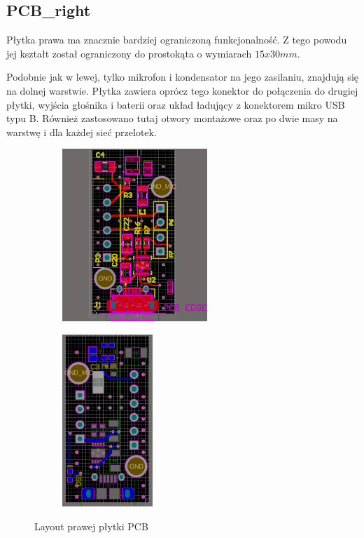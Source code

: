 \subsection{PCB\_right}

Płytka prawa ma znacznie bardziej ograniczoną funkcjonalność. Z tego powodu jej kształt został ograniczony do prostokąta o wymiarach $15x30mm$. 

Podobnie jak w lewej, tylko mikrofon i kondensator na jego zasilaniu, znajdują się na dolnej warstwie. Płytka zawiera oprócz tego konektor do połączenia do drugiej płytki, wyjścia głośnika i baterii oraz układ ładujący z konektorem mikro USB typu B. Również zastosowano tutaj otwory montażowe oraz po dwie masy na warstwę i dla każdej sieć przelotek.

\begin{figure}[H]
	\centering
	\begin{subfigure}{.45\textwidth}
		\centering
		\includegraphics[height=6.5cm]{zdjecia/PCB/PCB_right_top.png}
	\end{subfigure}
	\begin{subfigure}{.45\textwidth}
		\centering
		\includegraphics[height=6.5cm]{zdjecia/PCB/PCB_right_bottom.png}
	\end{subfigure}
	\caption{\label{PCB_right} Layout prawej płytki PCB}
\end{figure}

